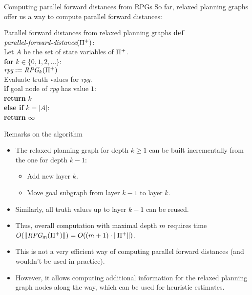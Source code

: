 \documentclass{gkibeamer}
\begin{document}
\begin{frame}{Computing parallel forward distances from RPGs}
  So far, relaxed planning graphs offer us a way to compute parallel
  forward distances:
  \begin{block}{Parallel forward distances from relaxed planning
      graphs}
    \textbf{def}
    $\textit{parallel-forward-distance}({\Pi}^+)$: \\
    {}\qquad Let $A$ be the set of state variables of
    ${\Pi}^+$. \\
    {}\qquad\textbf{for} $k \in \{0, 1, 2, \dots\}$: \\
    {}\qquad\qquad $\textit{rpg} := \textit{RPG}_k({\Pi}^+)$ \\
    {}\qquad\qquad Evaluate truth values for \textit{rpg}. \\
    {}\qquad\qquad \textbf{if} goal node of \textit{rpg}
    has value $1$: \\
    {}\qquad\qquad\qquad \textbf{return} $k$ \\
    {}\qquad\qquad \textbf{else if} $k = |A|$: \\
    {}\qquad\qquad\qquad \textbf{return} $\infty$
  \end{block}
\end{frame}

\begin{frame}{Remarks on the algorithm}
  \begin{itemize}
  \item The relaxed planning graph for depth $k \ge 1$ can be built
    \alert{incrementally} from the one for depth $k-1$:
    \begin{itemize}
    \item Add new layer $k$.
    \item Move goal subgraph from layer $k-1$ to layer $k$.
    \end{itemize}
  \item Similarly, all truth values up to layer $k-1$ can be reused.
  \item Thus, overall computation with maximal depth $m$ requires time
    $O(\|\textit{RPG}_m({\Pi}^+)\|) = O((m+1) \cdot
    \|{\Pi}^+\|)$.
  \item This is not a very efficient way of computing parallel forward
    distances (and wouldn't be used in practice).
  \item However, it allows computing \alert{additional information}
    for the relaxed planning graph nodes along the way, which can be
    used for heuristic estimates.
  \end{itemize}
\end{frame}
\end{document}
